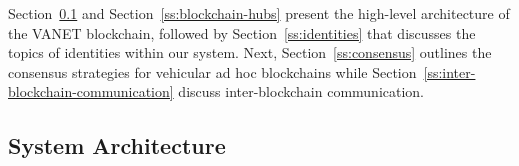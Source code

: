 \documentclass{llncs}
\begin{document}
{		Section~\ref{ss:architecture-overview} and Section~\ref{ss:blockchain-hubs} present the high-level architecture of the VANET blockchain, followed by Section~\ref{ss:identities} that discusses the topics of identities within our system. Next, Section~\ref{ss:consensus} outlines the consensus strategies for vehicular ad hoc blockchains while Section~\ref{ss:inter-blockchain-communication} discuss inter-blockchain communication.
		
		
		\subsection{System Architecture}
			\label{ss:architecture-overview}
			
}
\end{document}
